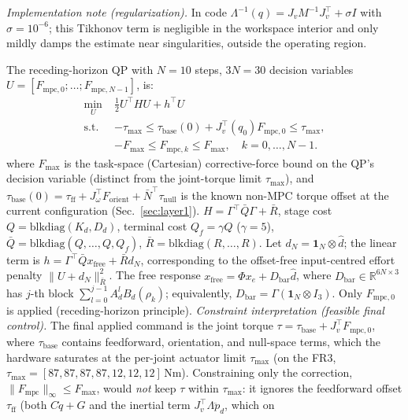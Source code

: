 \documentclass[journal]{IEEEtran}
\newcommand{\Fmpc}{F_{\text{mpc}}}
\newcommand{\Fmpck}[1]{F_{\text{mpc},#1}}
\newcommand{\dhat}{\hat{d}}
\begin{document}
\textit{Implementation note (regularization).}
In code $\Lambda^{-1}(q)=J_vM^{-1}J_v^\top+\sigma I$ with $\sigma=10^{-6}$; this
Tikhonov term is negligible in the workspace interior and only mildly damps the
estimate near singularities, outside the operating region.

The receding-horizon QP with $N=10$ steps, $3N=30$ decision variables
$U=[\Fmpck{0};\ldots;\Fmpck{N-1}]$, is:
\begin{subequations}\label{eq:QP}
\begin{align}
  \min_U\;& \tfrac{1}{2}U^\top HU+h^\top U \label{eq:QP_cost}\\
  \text{s.t.}\;&
  -\tau_{\max}\leq
  \tau_{\text{base}}(0)+J_v^\top(q_0)\Fmpck{0}
  \leq\tau_{\max}, \label{eq:QP_torque}\\
  & -F_{\max}\leq\Fmpck{k}\leq F_{\max},
  \quad k=0,\ldots,N-1. \label{eq:QP_force}
\end{align}
\end{subequations}
where $F_{\max}$ is the task-space (Cartesian) corrective-force bound on the
QP's decision variable (distinct from the joint-torque limit $\tau_{\max}$),
and $\tau_{\text{base}}(0)=\tau_{\text{ff}}+J_\omega^\top F_{\text{orient}}+\bar{N}^\top\tau_{\text{null}}$
is the known non-MPC torque offset at the current configuration
(Sec.~\ref{sec:layer1}). $H=\Gamma^\top\bar{Q}\Gamma+\bar{R}$, stage cost
$Q=\text{blkdiag}(K_d,D_d)$, terminal cost $Q_f=\gamma Q$ ($\gamma=5$),
$\bar{Q}=\text{blkdiag}(Q,\ldots,Q,Q_f)$,
$\bar{R}=\text{blkdiag}(R,\ldots,R)$.
Let $d_N=\mathbf 1_N\otimes\dhat$; the linear term is
$h=\Gamma^\top\bar{Q}x_{\text{free}}+\bar R d_N$, corresponding to the
offset-free input-centred effort penalty $\|U+d_N\|_{\bar R}^2$.
The free response $x_{\text{free}}=\Phi x_e+D_{\text{bar}}\dhat$,
where $D_{\text{bar}}\in\mathbb{R}^{6N\times3}$ has $j$-th block
$\sum_{l=0}^{j-1}A_d^l B_d(\rho_k)$; equivalently,
$D_{\text{bar}}=\Gamma(\mathbf 1_N\otimes I_3)$.
Only $\Fmpck{0}$ is applied (receding-horizon principle).
\emph{Constraint interpretation (feasible final control).} The final
applied command is the joint torque
$\tau=\tau_{\text{base}}+J_v^\top\Fmpck{0}$, where
$\tau_{\text{base}}$ contains feedforward, orientation, and null-space terms,
which the hardware saturates at the per-joint actuator limit $\tau_{\max}$
(on the FR3, $\tau_{\max}=[87,87,87,87,12,12,12]$\,Nm). Constraining only the
correction, $\|\Fmpc\|_\infty\leq F_{\max}$, would \emph{not} keep $\tau$
within $\tau_{\max}$: it ignores the feedforward offset $\tau_{\text{ff}}$
(both $C\dot{q}+G$ and the inertial term $J_v^\top\Lambda\ddot{p}_d$, which on
\end{document}
